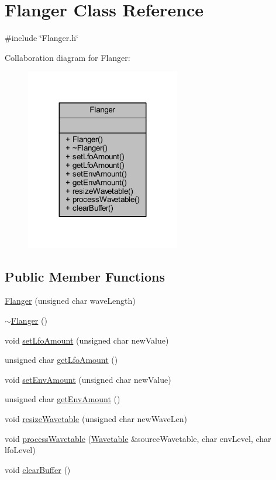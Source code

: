 \hypertarget{class_flanger}{}\section{Flanger Class Reference}
\label{class_flanger}


{\ttfamily \#include \char`\"{}Flanger.\+h\char`\"{}}



Collaboration diagram for Flanger\+:
\nopagebreak
\begin{figure}[H]
\begin{center}
\leavevmode
\includegraphics[width=191pt]{d4/d71/class_flanger__coll__graph}
\end{center}
\end{figure}
\subsection*{Public Member Functions}
\begin{DoxyCompactItemize}
\item 
\hyperlink{class_flanger_a973e269aa2e2bab6c56e9d4c92b85baf}{Flanger} (unsigned char wave\+Length)
\item 
\hyperlink{class_flanger_ab37e3e9863d1f762ed25147dd8db2dec}{$\sim$\+Flanger} ()
\item 
void \hyperlink{class_flanger_a311ea2020c379266da75e57bec0cc5ad}{set\+Lfo\+Amount} (unsigned char new\+Value)
\item 
unsigned char \hyperlink{class_flanger_a6d6289cd3c9ef3cc997e83441a89194f}{get\+Lfo\+Amount} ()
\item 
void \hyperlink{class_flanger_ac4f38ebccacae85c724fe43f13caf636}{set\+Env\+Amount} (unsigned char new\+Value)
\item 
unsigned char \hyperlink{class_flanger_ae86b7a0721c3a9893f3b9ec5f4b6c0fb}{get\+Env\+Amount} ()
\item 
void \hyperlink{class_flanger_a382a9889299da650998fe547dd859c5f}{resize\+Wavetable} (unsigned char new\+Wave\+Len)
\item 
void \hyperlink{class_flanger_af0c970c914193ea326ca177869f508c1}{process\+Wavetable} (\hyperlink{class_wavetable}{Wavetable} \&source\+Wavetable, char env\+Level, char lfo\+Level)
\item 
void \hyperlink{class_flanger_ae94929f1469d1924d24537e2b265796d}{clear\+Buffer} ()
\end{DoxyCompactItemize}


